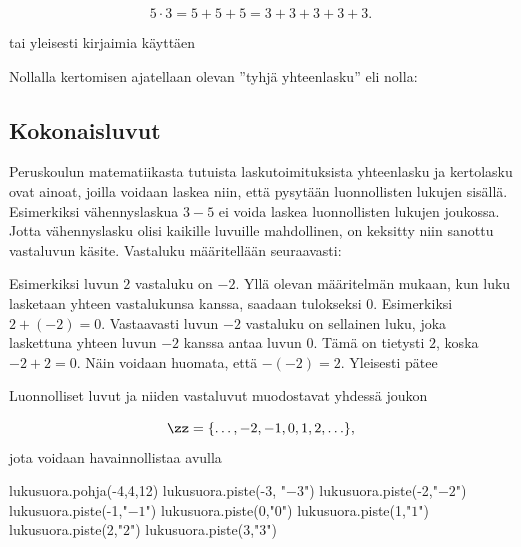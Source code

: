 \[5 \cdot 3 = 5 + 5 + 5 = 3 + 3 + 3 + 3 + 3.\]

tai yleisesti kirjaimia käyttäen

\laatikko{ \[m \cdot n = \underbrace{m + m + \ldots + m}_{n\text{ kpl}} = \underbrace{n + n + \ldots + n}_{m\text{ kpl}}.\] }

Nollalla kertomisen ajatellaan olevan ''tyhjä yhteenlasku'' eli nolla:
\laatikko{ \[0 \cdot m = 0\] }


\subsection*{Kokonaisluvut}

Peruskoulun matematiikasta tutuista laskutoimituksista yhteenlasku ja kertolasku ovat ainoat,
joilla voidaan laskea niin, että pysytään luonnollisten lukujen sisällä. Esimerkiksi vähennyslaskua
$3-5$ ei voida laskea luonnollisten lukujen joukossa. Jotta vähennyslasku olisi kaikille luvuille
mahdollinen, on keksitty niin sanottu vastaluvun käsite. Vastaluku määritellään seuraavasti:


Esimerkiksi luvun $2$ vastaluku on $-2$. Yllä olevan määritelmän mukaan, kun luku lasketaan yhteen vastalukunsa kanssa, saadaan tulokseksi $0$. Esimerkiksi $2+(-2)=0$. Vastaavasti luvun $-2$ vastaluku on sellainen luku, joka laskettuna yhteen luvun $-2$ kanssa antaa luvun $0$. Tämä on tietysti $2$, koska $-2+2=0$. Näin voidaan huomata, että $-(-2)=2$. Yleisesti pätee


Luonnolliset luvut ja niiden vastaluvut muodostavat yhdessä  joukon

\[\zz = \{\ldots, -2, -1, 0, 1, 2, \ldots\},\] jota voidaan havainnollistaa  avulla

\begin{kuva}
	lukusuora.pohja(-4,4,12)
	lukusuora.piste(-3, "$-3$")
	lukusuora.piste(-2,"$-2$")
	lukusuora.piste(-1,"$-1$")
	lukusuora.piste(0,"$0$")
	lukusuora.piste(1,"$1$")
	lukusuora.piste(2,"$2$")
	lukusuora.piste(3,"$3$")
\end{kuva}

